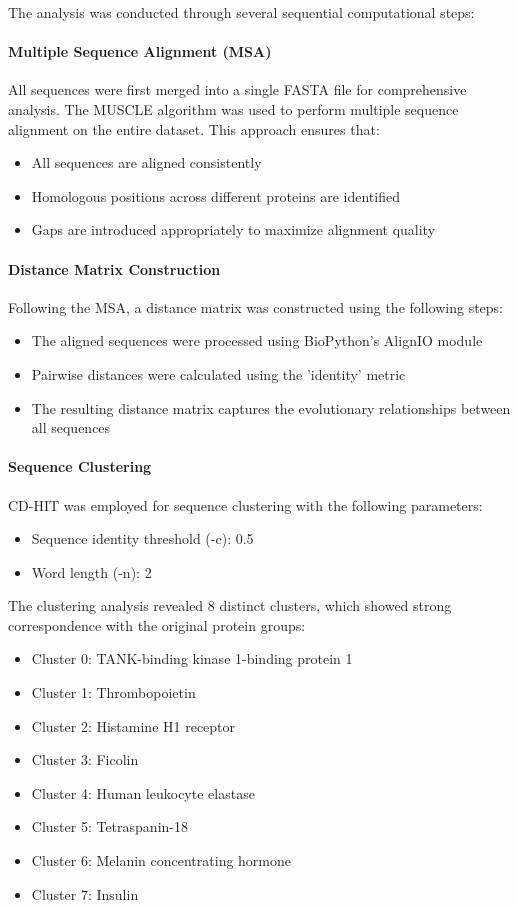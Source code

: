 \documentclass[11pt, a4paper, hidelinks]{article}
\begin{document}
The analysis was conducted through several sequential computational steps:

\paragraph{Multiple Sequence Alignment (MSA)}
All sequences were first merged into a single FASTA file for comprehensive analysis. The MUSCLE algorithm was used to perform multiple sequence alignment on the entire dataset. This approach ensures that:
\begin{itemize}
    \item All sequences are aligned consistently
    \item Homologous positions across different proteins are identified
    \item Gaps are introduced appropriately to maximize alignment quality
\end{itemize}

\paragraph{Distance Matrix Construction}
Following the MSA, a distance matrix was constructed using the following steps:
\begin{itemize}
    \item The aligned sequences were processed using BioPython's AlignIO module
    \item Pairwise distances were calculated using the 'identity' metric
    \item The resulting distance matrix captures the evolutionary relationships between all sequences
\end{itemize}

\paragraph{Sequence Clustering}
CD-HIT was employed for sequence clustering with the following parameters:
\begin{itemize}
    \item Sequence identity threshold (-c): 0.5
    \item Word length (-n): 2
\end{itemize}

The clustering analysis revealed 8 distinct clusters, which showed strong correspondence with the original protein groups:
\begin{itemize}
    \item Cluster 0: TANK-binding kinase 1-binding protein 1
    \item Cluster 1: Thrombopoietin
    \item Cluster 2: Histamine H1 receptor
    \item Cluster 3: Ficolin
    \item Cluster 4: Human leukocyte elastase
    \item Cluster 5: Tetraspanin-18
    \item Cluster 6: Melanin concentrating hormone
    \item Cluster 7: Insulin
\end{itemize}
\end{document}
